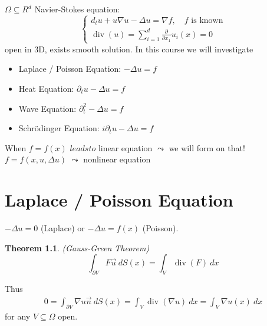 \documentclass{report}
\theoremstyle{tommy}
\newtheorem{thm}[defn]{Theorem}
\renewcommand\div{\operatorname{div}}
\begin{document}
\(\Omega \subseteq R^d\)
Navier-Stokes equation:
\[
  \begin{cases}
    d_t u + u \nabla u - \Delta u = \nabla f, \quad f \text{ is known} \\
    \div(u) = \sum_{i=1}^d \frac{\partial}{\partial x_1} u_i(x) = 0
  \end{cases}
\]
open in 3D, exists smooth solution. In this course we will investigate
\begin{itemize}
  \item Laplace / Poisson Equation: \(-\Delta u = f\)
  \item Heat Equation: \(\partial_t u - \Delta u = f\)
  \item Wave Equation: \(\partial_t^2 - \Delta u = f\)
  \item Schrödinger Equation: \(i \partial_t u - \Delta u = f\)
\end{itemize}
When \(f = f(x)\) \(leadsto\) linear equation \(\leadsto\) we will form on that!\\
\(f = f(x, u, \Delta u)\) \(\leadsto\) nonlinear equation


\chapter{Laplace / Poisson Equation}
\(- \Delta u = 0\) (Laplace) or \(-\Delta u = f(x)\) (Poisson).


\begin{thm}(Gauss-Green Theorem)
  \[ \int_{\partial V} F \vec{u}\ dS(x) = \int_V \div(F)\ dx \]
\end{thm}
Thus
\begin{align*}
  0 = \int_{\partial V} \nabla u \vec{n}\ dS(x)
  = \int_V \div(\nabla u) \ dx
  = \int_V \nabla u(x) \ dx
\end{align*}
for any \(V \subseteq \Omega \) open.
\end{document}
